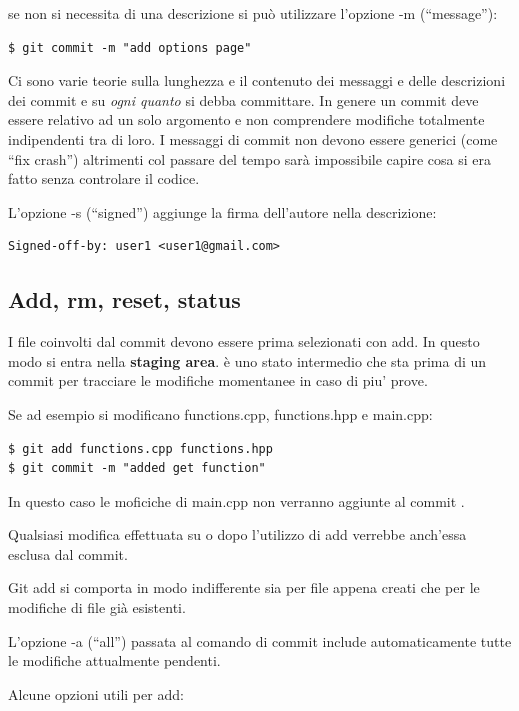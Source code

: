 \documentclass{article} \usepackage[textwidth=19cm,textheight=24cm]{geometry}
\begin{document}
se non si necessita di una descrizione si può utilizzare l'opzione -m
(``message''):

\begin{verbatim}
$ git commit -m "add options page"
\end{verbatim}

Ci sono varie teorie  sulla lunghezza e il contenuto dei messaggi e delle
descrizioni dei commit e su \textit{ogni quanto} si debba committare. In genere un
commit deve essere relativo ad un solo argomento e non comprendere modifiche
totalmente indipendenti tra di loro. I messaggi di commit non devono essere
generici (come ``fix crash'') altrimenti col passare del tempo sarà impossibile
capire cosa si era fatto senza controlare il codice.

L'opzione -s (``signed'') aggiunge la firma dell'autore nella descrizione:

\begin{verbatim}
Signed-off-by: user1 <user1@gmail.com>
\end{verbatim}

\subsection{Add, rm, reset, status}

I file coinvolti dal commit devono essere prima selezionati con add. In questo
modo si entra nella \textbf{staging area}. è uno stato intermedio che sta prima di
un commit per tracciare le modifiche momentanee in caso di piu' prove.

Se ad esempio si modificano functions.cpp, functions.hpp e main.cpp:

\begin{verbatim}
$ git add functions.cpp functions.hpp
$ git commit -m "added get function"
\end{verbatim}

In questo caso le moficiche di main.cpp non verranno aggiunte al commit .

Qualsiasi modifica effettuata su  o  dopo l'utilizzo
di add verrebbe anch'essa esclusa dal commit.

Git add si comporta in modo indifferente sia per file appena creati che per le
modifiche di file già esistenti.

L'opzione -a (``all'') passata al comando di commit include automaticamente tutte
le modifiche attualmente pendenti.

Alcune opzioni utili per add:
\end{document}
